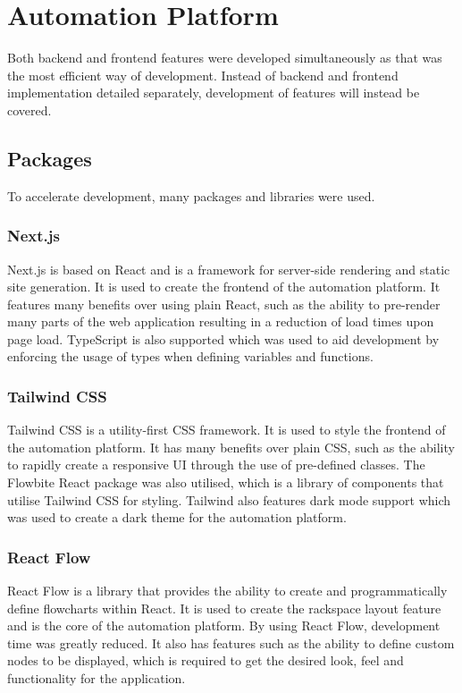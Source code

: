 \section{Automation Platform}
Both backend and frontend features were developed simultaneously as that was the most efficient way of development. Instead of backend and frontend implementation detailed separately, development of features will instead be covered.
\subsection{Packages}
To accelerate development, many packages and libraries were used.
\subsubsection{Next.js}
Next.js is based on React and is a framework for server-side rendering and static site generation. It is used to create the frontend of the automation platform. It features many benefits over using plain React, such as the ability to pre-render many parts of the web application resulting in a reduction of load times upon page load. TypeScript is also supported which was used to aid development by enforcing the usage of types when defining variables and functions.

\subsubsection{Tailwind CSS}
Tailwind CSS is a utility-first CSS framework. It is used to style the frontend of the automation platform. It has many benefits over plain CSS, such as the ability to rapidly create a responsive UI through the use of pre-defined classes. The Flowbite React package was also utilised, which is a library of components that utilise Tailwind CSS for styling. Tailwind also features dark mode support which was used to create a dark theme for the automation platform.

\subsubsection{React Flow}
React Flow is a library that provides the ability to create and programmatically define flowcharts within React. It is used to create the rackspace layout feature and is the core of the automation platform. By using React Flow, development time was greatly reduced. It also has features such as the ability to define custom nodes to be displayed, which is required to get the desired look, feel and functionality for the application.

